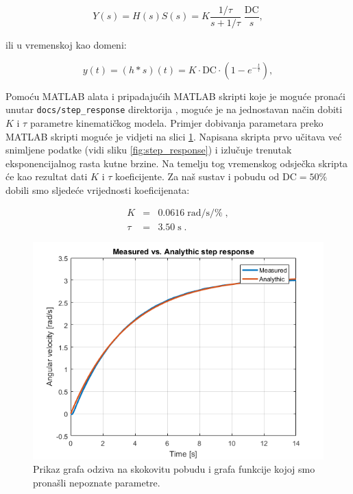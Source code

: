\documentclass[times, utf8, diplomski, numeric]{templates/template}
\begin{document}
{{{            \begin{equation}
                Y(s) = H(s)S(s) = K \frac{1/\tau}{s + 1/\tau} \; \frac{\text{DC}}{s},
            \end{equation}

            ili u vremenskoj kao domeni:

            \begin{equation}
                y(t) = (h \ast s)(t) = K \cdot \text{DC} \cdot (1 - e^{-\frac{t}{\tau}}),
            \end{equation}

            Pomoću MATLAB alata i pripadajućih MATLAB skripti koje je moguće pronaći unutar \texttt{docs/step\_response} direktorija \cite{link_na_fit}, moguće je na jednostavan način dobiti $K$ i $\tau$ parametre kinematičkog modela. Primjer dobivanja parametara preko MATLAB skripti moguće je vidjeti na slici \ref{fig:fittana_funkcija}. Napisana skripta prvo učitava već snimljene podatke (vidi sliku \ref{fig:step_response}) i izlučuje trenutak eksponencijalnog rasta kutne brzine. Na temelju tog vremenskog odsječka skripta će kao rezultat dati $K$ i $\tau$ koeficijente. Za naš sustav i pobudu od $\text{DC}=50\%$ dobili smo sljedeće vrijednosti koeficijenata:

            \begin{equation}
            \begin{array}{rcl}
                K    & = & 0.0616 \; \text{rad} / \text{s} / \% \;, \\
                \tau & = & 3.50 \; \text{s} \;.
            \end{array}
            \end{equation} 

            \begin{figure}[htb]
            \centering
            \includegraphics[width=1.0\textwidth]{other/fittana_funkcija.png}
            \caption{Prikaz grafa odziva na skokovitu pobudu i grafa funkcije kojoj smo pronašli nepoznate parametre.}
            \label{fig:fittana_funkcija}
            \end{figure}

}}}
\end{document}
